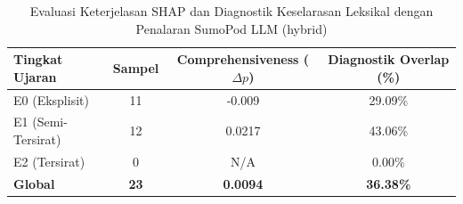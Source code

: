 \begin{table}[htbp]
\centering
\caption{Evaluasi Keterjelasan SHAP dan Diagnostik Keselarasan Leksikal dengan Penalaran SumoPod LLM (hybrid)}
\label{tab:dual_xai_consistency}
\begin{tabular}{lccc}
\hline
\textbf{Tingkat Ujaran} & \textbf{Sampel} & \textbf{Comprehensiveness ($\Delta p$)} & \textbf{Diagnostik Overlap (\%)} \\
\hline
E0 (Eksplisit) & 11 & -0.009 & 29.09\% \\
E1 (Semi-Tersirat) & 12 & 0.0217 & 43.06\% \\
E2 (Tersirat) & 0 & N/A & 0.00\% \\
\hline
\textbf{Global} & \textbf{23} & \textbf{0.0094} & \textbf{36.38\%} \\
\hline
\end{tabular}
\end{table}

